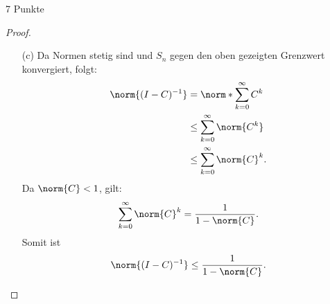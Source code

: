 \documentclass{problemset}
\begin{document}
\begin{problem}{7 Punkte}
\begin{proof}
\begin{enumerate}
        \item[(c)]
              Da Normen stetig sind und \( S_n \) gegen den oben gezeigten
              Grenzwert konvergiert, folgt:
              \begin{align*}
                  \norm{(I - C)^{-1}} & = \norm*{\sum_{k=0}^\infty C^k}    \\
                                      & \leq \sum_{k=0}^\infty \norm{C^k}  \\
                                      & \leq \sum_{k=0}^\infty \norm{C}^k.
              \end{align*}
              Da \( \norm{C} < 1 \), gilt:
              \[
                  \sum_{k=0}^\infty \norm{C}^k = \frac{1}{1 - \norm{C}}.
              \]
              Somit ist
              \[
                  \norm{(I - C)^{-1}} \leq \frac{1}{1 - \norm{C}}.
              \]
    \end{enumerate}
\end{proof}
\end{problem}
\end{document}
